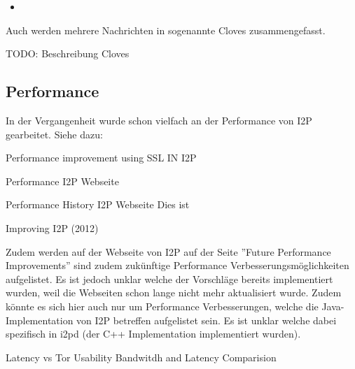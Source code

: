 \begin{itemize}
    \item
\end{itemize}

Auch werden mehrere Nachrichten in sogenannte Cloves zusammengefasst.

TODO: Beschreibung Cloves

\cite{de_boer_invisible_2019}

\cite{noauthor_intro_nodate}


\subsection{Performance}

In der Vergangenheit wurde schon vielfach an der Performance von I2P gearbeitet.
Siehe dazu:

Performance improvement using SSL IN I2P
\cite{vashi_performance_2015}

Performance I2P Webseite
\cite{noauthor_performance_nodate}

Performance History I2P Webseite
\cite{noauthor_performance_nodate-1}
Dies ist 

Improving I2P (2012)
\cite{timpanaro_improving_2012}

Zudem werden auf der Webseite von I2P auf der Seite ''Future Performance Improvements'' sind zudem zukünftige Performance Verbesserungsmöglichkeiten aufgelistet.
\cite{noauthor_future_nodate}
Es ist jedoch unklar welche der Vorschläge bereits implementiert wurden, weil die Webseiten schon lange nicht mehr aktualisiert wurde.
Zudem könnte es sich hier auch nur um Performance Verbesserungen, welche die Java-Implementation von I2P betreffen aufgelistet sein.
Es ist unklar welche dabei spezifisch in i2pd (der C++ Implementation implementiert wurden).

Latency vs Tor Usability Bandwitdh and Latency Comparision
\cite{ehlert_i2p_2011}


%
%
%
%
%
%
%
%


